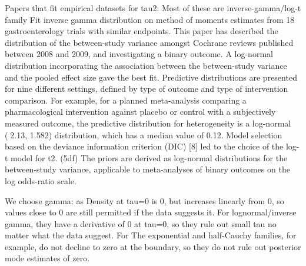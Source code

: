 Papers that fit empirical datasets for tau2: Most of these are inverse-gamma/log-t family
Fit inverse gamma distribution on method of moments estimates from 18 gastroenterology trials with similar endpoints.
This paper has described the distribution of the between-study variance amongst Cochrane reviews published between 2008 and 2009, and investigating a binary outcome. A log-normal distribution incorporating the association between the between-study variance and the pooled effect size gave the best fit.
Predictive distributions are presented for nine different settings, defined by type of outcome and type of intervention comparison. For example, for a planned meta-analysis comparing a pharmacological intervention against placebo or control with a subjectively measured outcome, the predictive distribution for heterogeneity is a log-normal (2.13, 1.582) distribution, which has a median value of 0.12.
Model selection based on the deviance information criterion (DIC) [8] led to the choice of the log-t model for t2. (5df)
The priors are derived as log-normal distributions for the between-study variance, applicable to meta-analyses of binary outcomes on the log odds-ratio scale.
%

We choose gamma: as Density at tau=0 is 0, but increases linearly from 0, so values close to 0 are still permitted if the data suggests it.
For lognormal/inverse gamma, they have a derivative of 0 at tau=0, so they rule out small tau no matter what the data suggest.
For The exponential and half-Cauchy families, for example, do not decline to zero at the boundary, so they do not rule out posterior mode estimates of zero.

